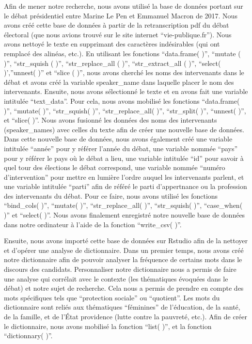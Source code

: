 \documentclass[
  letterpaper,
  DIV=11,
  numbers=noendperiod]{scrartcl}
\begin{document}
Afin de mener notre recherche, nous avons utilisé la base de données
portant sur le débat présidentiel entre Marine Le Pen et Emmanuel Macron
de 2017. Nous avons créé cette base de données à partir de la
retranscription pdf du débat électoral (que nous avions trouvé sur le
site internet ``vie-publique.fr''). Nous avons nettoyé le texte en
supprimant des caractères indésirables (qui ont remplacé des alinéas,
etc.). En utilisant les fonctions ``data.frame( )'', ``mutate ( )'',
``str\_squish ( )'', ``str\_replace\_all ( )'', ``str\_extract\_all (
)'', ``select( )',''unnest( )'' et ``slice ( )'', nous avons cherché les
noms des intervenants dans le débat et avons créé la variable
speaker\_name dans laquelle placer le nom des intervenants. Ensuite,
nous avons sélectionné le texte et en avons fait une variable intitulée
``text\_data''. Pour cela, nous avons mobilisé les fonctions
``data.frame( )'', ``mutate( )'', ``str\_squish( )'',
``str\_replace\_all( )'', ``str\_split( )'', ``unnest( )'', et ``slice(
)''. Nous avons fusionné les données des noms des intervenants
(speaker\_names) avec celles du texte afin de créer une nouvelle base de
données. Dans cette nouvelle base de données, nous avons également créé
une variable intitulée ``année'' pour y référer l'année du débat, une
variable nommée ``pays'' pour y référer le pays où le débat a lieu, une
variable intitulée ``id'' pour savoir à quel tour des élections le débat
correspond, une variable nommée ``numéro d'intervention'' pour mettre en
lumière l'ordre auquel les intervenants parlent, et une variable
intitulée ``parti'' afin de référé le parti d'appertnance ou la
profession des intervenants du débat. Pour ce faire, nous avons utilisé
les fonctions ``bind\_cols( )'', ``mutate( )'', ``str\_replace\_all(
)'', ``str\_squish( )'', ``case\_when( )'' et ``select( )''. Nous avons
finalement enregistré notre nouvelle base de données dans notre
ordinateur à l'aide de la fonction ``write\_csv( )''.

Ensuite, nous avons importé cette base de données sur Rstudio afin de la
nettoyer et d'opérer une analyse de dictionnaire. Dans un premier temps,
nous avons créé notre dictionnaire afin de pouvoir analyser la fréquence
de certains mots dans le discours des candidats. Personnaliser notre
dictionnaire nous a permis de faire une analyse qui corrélait avec le
contexte (les thématiques évoquées dans le débat) et notre sujet de
recherche. Cela nous a permis de prendre en compte des mots spécifiques
tels que ``protection sociale'' ou ``quotient''. Les mots du
dictionnaire sont reliés aux thématiques ``féminines'' de l'éducation,
de la santé, de la famille, et de l'État providence (lutte contre la
pauvreté, etc.). Afin de créer le dictionnaire, nous avons mobilisé la
fonction ``list( )'', et la fonction ``dictionnary( )''.
\end{document}
